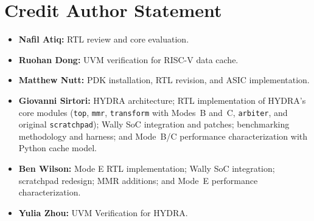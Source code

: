\documentclass[conference]{IEEEtran}
\begin{document}
\section{Credit Author Statement}
    \begin{itemize}
        \item \textbf{Nafil Atiq:} RTL review and core evaluation. %
        \item \textbf{Ruohan Dong:} UVM verification for RISC-V data cache.
        \item \textbf{Matthew Nutt:} PDK installation, RTL revision, and ASIC implementation.
        \item \textbf{Giovanni Sirtori:} HYDRA architecture; RTL implementation of HYDRA's core modules (\texttt{top}, \texttt{mmr}, \texttt{transform} with Modes~B and~C, \texttt{arbiter}, and original \texttt{scratchpad}); Wally SoC integration and patches; benchmarking methodology and harness; and Mode~B/C performance characterization with Python cache model.
        \item \textbf{Ben Wilson:} Mode E RTL implementation; Wally SoC integration; scratchpad redesign; MMR additions; and Mode~E performance characterization.
        \item \textbf{Yulia Zhou:} UVM Verification for HYDRA.
    \end{itemize}
\end{document}
